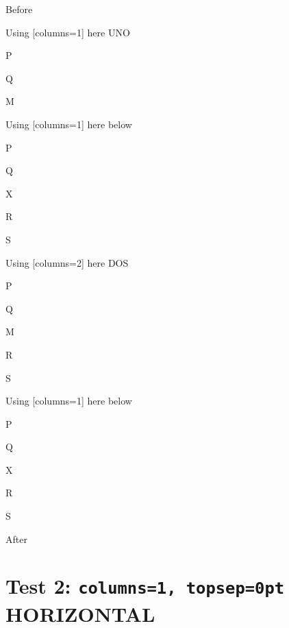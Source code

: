 \documentclass[12pt]{article}
\begin{document}
Before
\begin{enumext}[columns=2]

\item Using [columns=1] here UNO
  \begin{enumext}[columns=1]
     \item  P \item Q \item M %
  \end{enumext}

\item Using [columns=1] here below
\begin{enumext}[columns=1]
     \item  P \item Q \item X  \item R \item S
  \end{enumext}

\columnbreak

\item Using [columns=2] here DOS
  \begin{enumext}[columns=2]
    \item  P \item Q \item M \item R \item S
  \end{enumext}

\item Using [columns=1] here below
\begin{enumext}[columns=1]
     \item  P \item Q \item X  \item R \item S
  \end{enumext}

\end{enumext}
After

\newpage

\section{Test 2: \texttt{columns=1, topsep=0pt} HORIZONTAL}
\end{document}
